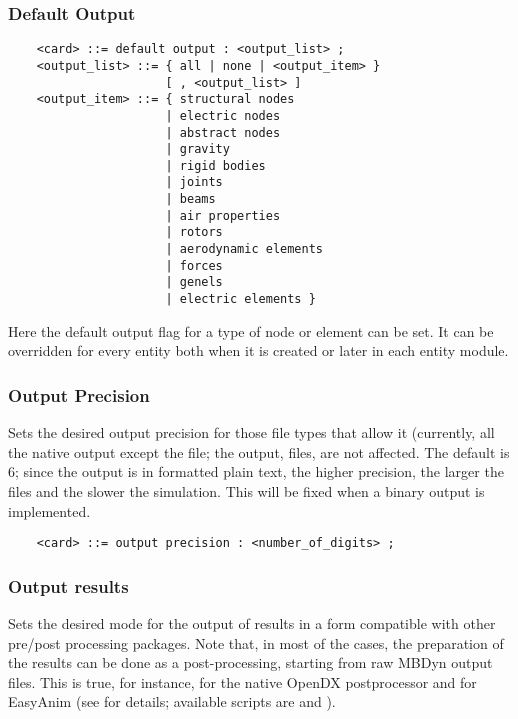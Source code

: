 \subsubsection{Default Output}
\begin{verbatim}
    <card> ::= default output : <output_list> ;
    <output_list> ::= { all | none | <output_item> } 
                      [ , <output_list> ]
    <output_item> ::= { structural nodes
                      | electric nodes
                      | abstract nodes
                      | gravity
                      | rigid bodies
                      | joints
                      | beams
                      | air properties
                      | rotors
                      | aerodynamic elements
                      | forces
                      | genels
                      | electric elements }
\end{verbatim}
Here the default output flag for a type of node or element can be set. It
can be overridden for every entity both when it is created or later in
each entity module.

\subsubsection{Output Precision}
Sets the desired output precision for those file types that allow it
(currently, all the native output except the  file; the
 output,  files, are not affected.
The default is 6; since the output is in formatted plain text, the higher
precision, the larger the files and the slower the simulation.
This will be fixed when a binary output is implemented.
\begin{verbatim}
    <card> ::= output precision : <number_of_digits> ;
\end{verbatim}

\subsubsection{Output results}
Sets the desired mode for the output of results in a form
compatible with other pre/post processing packages.
Note that, in most of the cases, the preparation of the 
results can be done as a post-processing, starting from
raw MBDyn output files.
This is true, for instance, for the native OpenDX postprocessor 
and for EasyAnim (see
for details; available scripts are 
and ).

